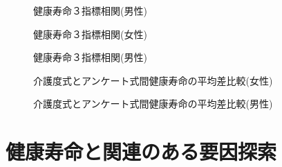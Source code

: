 \begin{figure}[h!]
	\begin{center}
		\caption{健康寿命３指標相関(男性)}
	\end{center}
\end{figure}



\begin{figure}[h!]
	\begin{center}
		\caption{健康寿命３指標相関(女性)}
	\end{center}
\end{figure}



\begin{figure}[h!]
	\begin{center}
		\caption{健康寿命３指標相関(男性)}
	\end{center}
\end{figure}

\begin{figure}[h!]
	\begin{center}
		\caption{介護度式とアンケート式間健康寿命の平均差比較(女性)}
	\end{center}
\end{figure}

\begin{figure}[h!]
	\begin{center}
		\caption{介護度式とアンケート式間健康寿命の平均差比較(男性)}
	\end{center}
\end{figure}




\chapter{健康寿命と関連のある要因探索}

